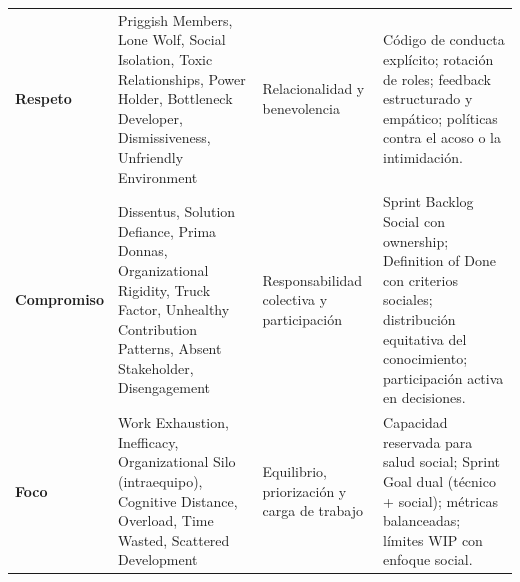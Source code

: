 \begin{table}[!htbp]
\begin{tabular}{@{}p{2.2cm}p{4.2cm}p{3.2cm}p{4.3cm}@{}}
        \textbf{Respeto}                                                                                                                                      &
        Priggish Members, Lone Wolf, Social Isolation, Toxic Relationships, Power Holder, Bottleneck Developer, Dismissiveness, Unfriendly Environment        &
        Relacionalidad y benevolencia                                                                                                                         &
        Código de conducta explícito; rotación de roles; feedback estructurado y empático; políticas contra el acoso o la intimidación.                                                                                                                               \\
        \addlinespace

        \textbf{Compromiso}                                                                                                                                   &
        Dissentus, Solution Defiance, Prima Donnas, Organizational Rigidity, Truck Factor, Unhealthy Contribution Patterns, Absent Stakeholder, Disengagement &
        Responsabilidad colectiva y participación                                                                                                             &
        Sprint Backlog Social con ownership; Definition of Done con criterios sociales; distribución equitativa del conocimiento; participación activa en decisiones.                                                                                                 \\
        \addlinespace

        \textbf{Foco}                                                                                                                                         &
        Work Exhaustion, Inefficacy, Organizational Silo (intraequipo), Cognitive Distance, Overload, Time Wasted, Scattered Development                      &
        Equilibrio, priorización y carga de trabajo                                                                                                           &
        Capacidad reservada para salud social; Sprint Goal dual (técnico + social); métricas balanceadas; límites WIP con enfoque social.                                                                                                                             \\
        \bottomrule
    \end{tabular}
\end{table}

